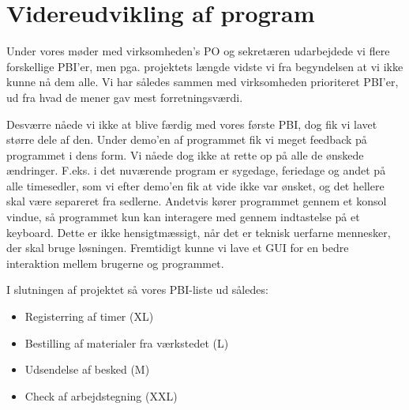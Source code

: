 \section{Videreudvikling af program}\label{vidu}

Under vores møder med virksomheden's PO og sekretæren udarbejdede vi flere forskellige PBI'er, men pga. projektets længde vidste vi fra begyndelsen at vi ikke kunne nå dem alle.
Vi har således sammen med virksomheden prioriteret PBI'er, ud fra hvad de mener gav mest forretningsværdi.

Desværre nåede vi ikke at blive færdig med vores første PBI, dog fik vi lavet større dele af den.
Under demo'en af programmet fik vi meget feedback på programmet i dens form.
Vi nåede dog ikke at rette op på alle de ønskede ændringer.
F.eks. i det nuværende program er sygedage, feriedage og andet på alle timesedler, som vi efter demo'en fik at vide ikke var ønsket, og det hellere skal være separeret fra sedlerne.
Andetvis kører programmet gennem et konsol vindue, så programmet kun kan interagere med gennem indtastelse på et keyboard.
Dette er ikke hensigtmæssigt, når det er teknisk uerfarne mennesker, der skal bruge løsningen.
Fremtidigt kunne vi lave et GUI for en bedre interaktion mellem brugerne og programmet.

I slutningen af projektet så vores PBI-liste ud således:
\begin{itemize}
\item Registerring af timer (XL)
\item Bestilling af materialer fra værkstedet (L) 
\item Udsendelse af besked (M)
\item Check af arbejdstegning (XXL)
\end{itemize}


